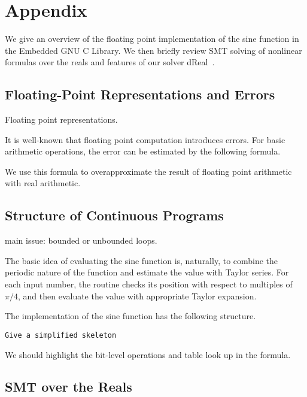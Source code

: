 \newpage
\section*{Appendix}

We give an overview of the floating point implementation of the sine function in the Embedded GNU C Library. We then briefly review SMT solving of nonlinear formulas over the reals and features of our solver dReal~\cite{}.

\subsection{Floating-Point Representations and Errors}

Floating point representations. 

It is well-known that floating point computation introduces errors. For basic arithmetic operations, the error can be estimated by the following formula. 

We use this formula to overapproximate the result of floating point arithmetic with real arithmetic. 

\subsection{Structure of Continuous Programs}

main issue: bounded or unbounded loops. 

The basic idea of evaluating the sine function is, naturally, to combine the periodic nature of the function and estimate the value with Taylor series. For each input number, the routine checks its position with respect to multiples of $\pi/4$, and then evaluate the value with appropriate Taylor expansion. 

The implementation of the sine function has the following structure. 
\begin{verbatim}
Give a simplified skeleton
\end{verbatim}

We should highlight the bit-level operations and table look up in the formula. 

\subsection{SMT over the Reals}



